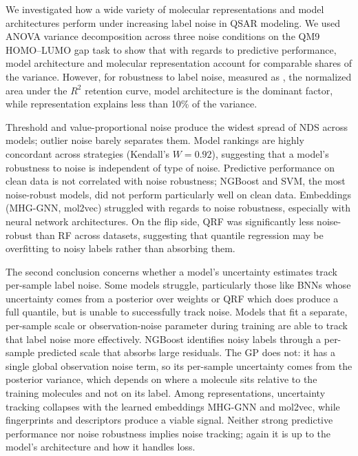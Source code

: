 We investigated how a wide variety of molecular representations and model architectures perform under increasing label noise in QSAR modeling. We used ANOVA variance decomposition across three noise conditions on the QM9 HOMO--LUMO gap task to show that with regards to predictive performance, model architecture and molecular representation account for comparable shares of the variance. However, for robustness to label noise, measured as \aucnorm, the normalized area under the $R^2$ retention curve, model architecture is the dominant factor, while representation explains less than 10\% of the variance.

Threshold and value-proportional noise produce the widest spread of NDS across models; outlier noise barely separates them. Model rankings are highly concordant across strategies (Kendall's $W = 0.92$), suggesting that a model's robustness to noise is independent of type of noise. Predictive performance on clean data is not correlated with noise robustness; NGBoost and SVM, the most noise-robust models, did not perform particularly well on clean data. Embeddings (MHG-GNN, mol2vec) struggled with regards to noise robustness, especially with neural network architectures. On the flip side, QRF was significantly less noise-robust than RF across datasets, suggesting that quantile regression may be overfitting to noisy labels rather than absorbing them.

The second conclusion concerns whether a model's uncertainty estimates track per-sample label noise. Some models struggle, particularly those like BNNs whose uncertainty comes from a posterior over weights or QRF which does produce a full quantile, but is unable to successfully track noise. 
Models that fit a separate, per-sample scale or observation-noise parameter during training are able to track that label noise more effectively. NGBoost identifies noisy labels through a per-sample predicted scale that absorbs large residuals. The GP does not: it has a single global observation noise term, so its per-sample uncertainty comes from the posterior variance, which depends on where a molecule sits relative to the training molecules and not on its label. Among representations, uncertainty tracking collapses with the learned embeddings MHG-GNN and mol2vec, while fingerprints and descriptors produce a viable signal. Neither strong predictive performance nor noise robustness implies noise tracking; again it is up to the model's architecture and how it handles loss. 

